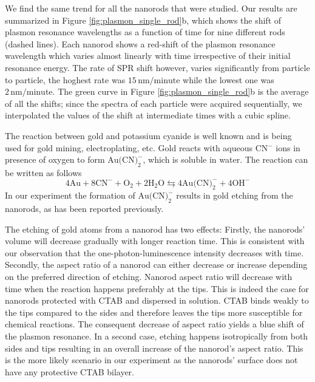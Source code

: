 \documentclass[a4paper,oneside,onecolumn]{article}
\newcommand{\nm}{\ensuremath{\,\textrm{nm}}}
\begin{document}
We find the same trend for all the nanorods that were studied. Our results are
summarized in Figure \ref{fig:plasmon_single_rod}b, which shows the shift of
plasmon resonance wavelengths as a function of time for nine different rods
(dashed lines). Each nanorod shows a red-shift of the plasmon resonance
wavelength which varies almost linearly with time irrespective of their
initial resonance energy. The rate of SPR shift however, varies significantly
from particle to particle, the hoghest rate was $15\nm/\textrm{minute}$
while the lowest one was $2\nm/\textrm{minute}$. The green curve in Figure
\ref{fig:plasmon_single_rod}b is the average of all the shifts; since the
spectra of each particle were acquired sequentially, we interpolated the
values of the shift at intermediate times with a cubic spline.

The reaction between gold and potassium cyanide is well known and is being used
for gold mining, electroplating, etc. Gold reacts with
aqueous CN$^-$ ions in presence of oxygen to form $\textrm{Au(CN)}_2^-$, which
is soluble in water. The reaction can be written as follows
\begin{equation*}
4\textrm{Au} + 8\textrm{CN}^-+\textrm{O}_2 + 2\textrm{H}_2\textrm{O}
\leftrightarrows 4\textrm{Au(CN)}_2^-+4\textrm{OH}^- \end{equation*}
In our experiment the formation of $\textrm{Au(CN)}_2^-$ results in gold etching from the nanorods, as has been reported previously\cite{Jana2002}.

The etching of gold atoms from a nanorod has two effects: Firstly, the
nanorods' volume will decrease gradually with longer reaction time. This is
consistent with our observation that the one-photon-luminescence intensity
decreases with time. Secondly, the aspect ratio of a nanorod can either
decrease or increase depending on the preferred direction of etching.
Nanorod aspect ratio will decrease with time when the reaction happens
preferably at the tips. This is indeed the case for nanorods protected with
CTAB and dispersed in solution\cite{Jana2002}. CTAB binds weakly to the tips
compared to the sides and therefore leaves the tips more susceptible for
chemical reactions\cite{Caswell2003}. The consequent decrease of aspect ratio
yields a blue shift of the plasmon resonance\cite{Link1999}. In a second case,
etching happens isotropically from both sides and tips resulting in an overall
increase of the nanorod's aspect ratio. This is the more likely scenario in
our experiment as the nanorods' surface does not have any protective CTAB bilayer.
\end{document}
